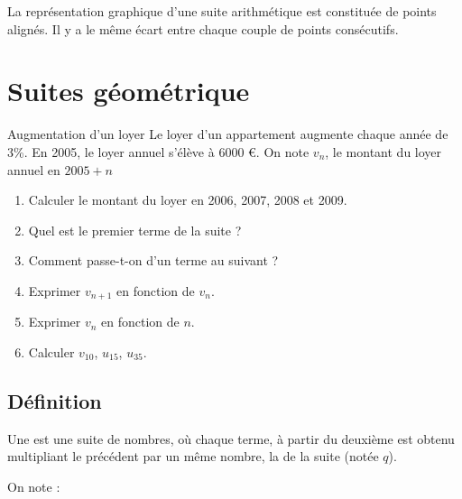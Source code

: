 \documentclass[12pt,a4paper]{article}
\begin{document}
\begin{mybilan}
	La représentation graphique d'une suite arithmétique est constituée de points alignés. Il y a le même écart entre chaque couple de points consécutifs.
\end{mybilan}


\section{Suites géométrique}

\begin{myact}{Augmentation d'un loyer}
	Le loyer d'un appartement augmente chaque année de 3\%. En 2005, le loyer annuel s'élève à 6000 €.
	On note $v_n$, le montant du loyer annuel en $2005 + n$
	
	\begin{enumerate}
		\item Calculer le montant du loyer en 2006, 2007, 2008 et 2009.
		\item Quel est le premier terme de la suite ?
		\item Comment passe-t-on d'un terme au suivant ?
		\item Exprimer $v_{n+1}$ en fonction de $v_n$.
		\item Exprimer $v_n$ en fonction de $n$.
		\item Calculer $v_{10}$, $u_{15}$, $u_{35}$.
	\end{enumerate}
	
\end{myact}


\subsection{Définition}

\begin{mybilan}

		
	Une  est une suite de nombres, où chaque terme, à partir du deuxième est obtenu multipliant le précédent par un même nombre, la  de la suite (notée $q$).	
	
	On note :
		


\end{mybilan}
\end{document}
